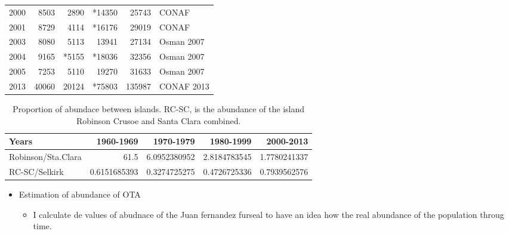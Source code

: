 \documentclass[11pt]{article}
\begin{document}
\begin{itemize}
\begin{table}[htb]
\begin{center}
\begin{tabular}{rrrrrl}
 2000  &      8503  &         2890  &   *14350  &        25743  &  CONAF                        \\
 2001  &      8729  &         4114  &   *16176  &        29019  &  CONAF                        \\
 2003  &      8080  &         5113  &    13941  &        27134  &  Osman 2007                   \\
 2004  &      9165  &        *5155  &   *18036  &        32356  &  Osman 2007                   \\
 2005  &      7253  &         5110  &    19270  &        31633  &  Osman 2007                   \\
 2013  &     40060  &        20124  &   *75803  &       135987  &  CONAF 2013                   \\
\end{tabular}
\end{center}
\end{table}


\begin{table}[htb]
\caption{Proportion of abundace between islands. RC-SC,  is the abundance of the island Robinson Crusoe and Santa Clara combined.}
\begin{center}
\begin{tabular}{lrrrr}
 Years               &     1960-1969  &     1970-1979  &     1980-1999  &     2000-2013  \\
\hline
 Robinson/Sta.Clara  &          61.5  &  6.0952380952  &  2.8184783545  &  1.7780241337  \\
 RC-SC/Selkirk       &  0.6151685393  &  0.3274725275  &  0.4726725336  &  0.7939562576  \\
\end{tabular}
\end{center}
\end{table}



\begin{itemize}

\item Estimation of abundance of OTA
\label{sec-5-2-1-1-1-1}%
\begin{itemize}
\item I calculate de values of abudnace of the Juan fernandez furseal to have an idea how
  the real abundance  of the population throug time.
\end{itemize}


\end{itemize}
\end{itemize}
\end{document}
